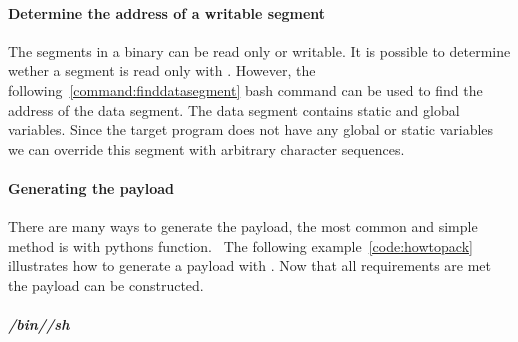 \documentclass[journal=tosc,submission, notanonymous]{iacrtrans}
\begin{document}
\paragraph{Determine the address of a writable segment}
\label{par:data}
The segments in a binary can be read only or writable. It is possible to determine wether a segment is read only with . However, the following~\cref{command:finddatasegment} bash command can be used to find the address of the data segment. The data segment contains static and global variables. Since the target program does not have any global or static variables we can override this segment with arbitrary character sequences.
\paragraph{Generating the payload}
\label{par:genthepayload}
There are many ways to generate the payload, the most common and simple method is with pythons  function.~\cite{proggen-rop} The following example~\cref{code:howtopack} illustrates how to generate a payload with .
Now that all requirements are met the payload can be constructed.
\subparagraph{/bin//sh}
\end{document}
